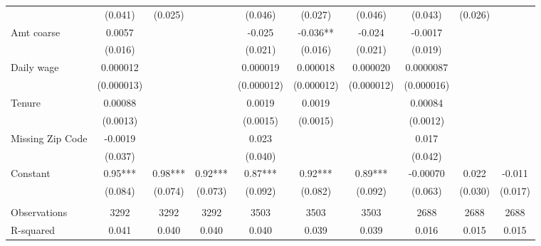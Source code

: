 \begin{tabular}{lccccccccc}
      & (0.041) & (0.025) &       & (0.046) & (0.027) & (0.046) & (0.043) & (0.026) &  \\
Amt coarse & 0.0057 &       &       & -0.025 & -0.036** & -0.024 & -0.0017 &       &  \\
      & (0.016) &       &       & (0.021) & (0.016) & (0.021) & (0.019) &       &  \\
Daily wage & 0.000012 &       &       & 0.000019 & 0.000018 & 0.000020 & 0.0000087 &       &  \\
      & (0.000013) &       &       & (0.000012) & (0.000012) & (0.000012) & (0.000016) &       &  \\
Tenure & 0.00088 &       &       & 0.0019 & 0.0019 &       & 0.00084 &       &  \\
      & (0.0013) &       &       & (0.0015) & (0.0015) &       & (0.0012) &       &  \\
Missing Zip Code & -0.0019 &       &       & 0.023 &       &       & 0.017 &       &  \\
      & (0.037) &       &       & (0.040) &       &       & (0.042) &       &  \\
Constant & 0.95*** & 0.98*** & 0.92*** & 0.87*** & 0.92*** & 0.89*** & -0.00070 & 0.022 & -0.011 \\
      & (0.084) & (0.074) & (0.073) & (0.092) & (0.082) & (0.092) & (0.063) & (0.030) & (0.017) \\
      &       &       &       &       &       &       &       &       &  \\
\midrule
Observations & 3292  & 3292  & 3292  & 3503  & 3503  & 3503  & 2688  & 2688  & 2688 \\
R-squared & 0.041 & 0.040 & 0.040 & 0.040 & 0.039 & 0.039 & 0.016 & 0.015 & 0.015 \\
\bottomrule
\bottomrule
\end{tabular}%
